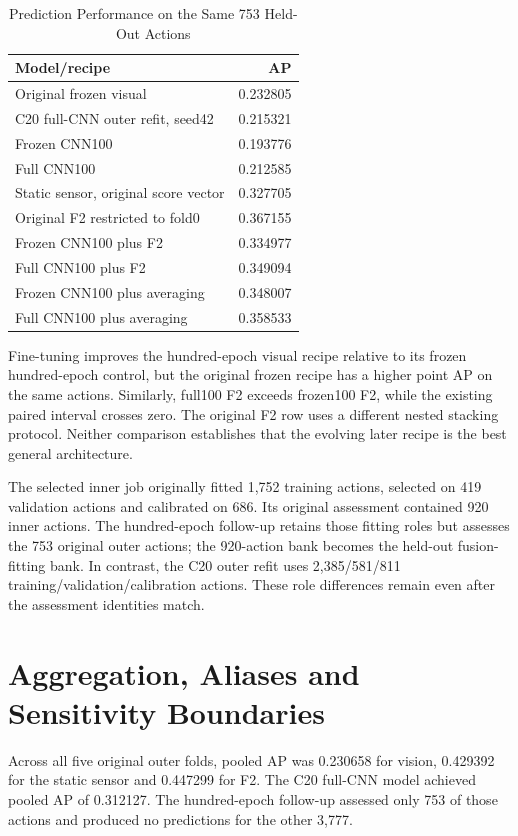 \begin{table}[htbp]
\caption{Prediction Performance on the Same 753 Held-Out Actions}\label{tab:753-supplement}
\centering\small

\begin{tabular}{lr}\hline Model/recipe&AP\\\hline
Original frozen visual&0.232805\\
C20 full-CNN outer refit, seed42&0.215321\\
Frozen CNN100&0.193776\\
Full CNN100&0.212585\\
Static sensor, original score vector&0.327705\\
Original F2 restricted to fold0&0.367155\\
Frozen CNN100 plus F2&0.334977\\
Full CNN100 plus F2&0.349094\\
Frozen CNN100 plus averaging&0.348007\\
Full CNN100 plus averaging&0.358533\\\hline
\end{tabular}
\end{table}

Fine-tuning improves the hundred-epoch visual recipe relative to its frozen
hundred-epoch control, but the original frozen recipe has a higher point AP on the same
actions. Similarly, full100 F2 exceeds frozen100 F2, while the existing paired interval
crosses zero. The original F2 row uses a different nested stacking protocol. Neither
comparison establishes that the evolving later recipe is the best general architecture.

The selected inner job originally fitted 1,752 training actions, selected on 419
validation actions and calibrated on 686. Its original assessment contained 920 inner
actions. The hundred-epoch follow-up retains those fitting roles but assesses the 753
original outer actions; the 920-action bank becomes the held-out fusion-fitting bank. In
contrast, the C20 outer refit uses 2,385/581/811 training/validation/calibration
actions. These role differences remain even after the assessment identities match.

\section{Aggregation, Aliases and Sensitivity Boundaries}
Across all five original outer folds, pooled AP was 0.230658 for vision, 0.429392 for
the static sensor and 0.447299 for F2. The C20 full-CNN model achieved pooled AP of
0.312127. The hundred-epoch follow-up assessed only 753 of those actions and produced no
predictions for the other 3,777.

